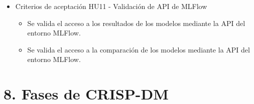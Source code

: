 \documentclass[
11pt, %
]{charter}
\begin{document}
\begin{itemize}
\begin{itemize}
\begin{itemize}
        \end{itemize}
      \item Criterios de aceptación HU11 - Validación de API de MLFlow
        \begin{itemize}
            \item Se valida el acceso a los resultados de los modelos mediante la API del entorno MLFlow.
            \item Se valida el acceso a la comparación de los modelos mediante la API del entorno MLFlow.
        \end{itemize}
    \end{itemize}
\end{itemize}

\section{8. Fases de CRISP-DM}
\end{document}
